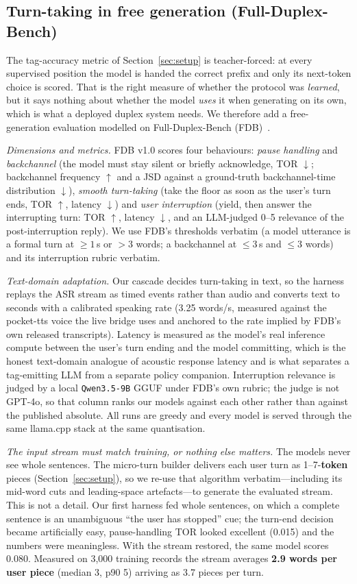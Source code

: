 \documentclass[conference]{IEEEtran}
\begin{document}
\subsection{Turn-taking in free generation (Full-Duplex-Bench)}
\label{sec:fdb_setup}
The tag-accuracy metric of Section~\ref{sec:setup} is teacher-forced: at every
supervised position the model is handed the correct prefix and only its next-token
choice is scored. That is the right measure of whether the protocol was
\emph{learned}, but it says nothing about whether the model \emph{uses} it when
generating on its own, which is what a deployed duplex system needs. We therefore
add a free-generation evaluation modelled on Full-Duplex-Bench
(FDB)~\cite{lin2025fdb}.

\emph{Dimensions and metrics.} FDB v1.0 scores four behaviours: \emph{pause
handling} and \emph{backchannel} (the model must stay silent or briefly
acknowledge, TOR $\downarrow$; backchannel frequency $\uparrow$ and a JSD against
a ground-truth backchannel-time distribution $\downarrow$), \emph{smooth
turn-taking} (take the floor as soon as the user's turn ends, TOR $\uparrow$,
latency $\downarrow$) and \emph{user interruption} (yield, then answer the
interrupting turn: TOR $\uparrow$, latency $\downarrow$, and an LLM-judged 0--5
relevance of the post-interruption reply). We use FDB's thresholds verbatim (a
model utterance is a formal turn at ${\ge}1$\,s or ${>}3$ words; a backchannel at
${\le}3$\,s and ${\le}3$ words) and its interruption rubric verbatim.

\emph{Text-domain adaptation.} Our cascade decides turn-taking in text, so the
harness replays the ASR stream as timed events rather than audio and converts text
to seconds with a calibrated speaking rate (3.25 words/s, measured against the
pocket-tts voice the live bridge uses and anchored to the rate implied by FDB's own
released transcripts). Latency is measured as the model's real inference compute
between the user's turn ending and the model committing, which is the honest
text-domain analogue of acoustic response latency and is what separates a
tag-emitting LLM from a separate policy companion. Interruption relevance is judged
by a local \texttt{Qwen3.5-9B} GGUF under FDB's own rubric; the judge is not
GPT-4o, so that column ranks our models against each other rather than against the
published absolute. All runs are greedy and every model is served through the same
llama.cpp stack at the same quantisation.

\emph{The input stream must match training, or nothing else matters.} The models
never see whole sentences. The micro-turn builder delivers each user turn as
1--7-\textbf{token} pieces (Section~\ref{sec:setup}), so we re-use that algorithm
verbatim---including its mid-word cuts and leading-space artefacts---to generate the
evaluated stream. This is not a detail. Our first harness fed whole sentences, on
which a complete sentence is an unambiguous ``the user has stopped'' cue; the
turn-end decision became artificially easy, pause-handling TOR looked excellent
(0.015) and the numbers were meaningless. With the stream restored, the same model
scores 0.080. Measured on 3{,}000 training records the stream averages
\textbf{2.9 words per user piece} (median 3, p90 5) arriving as 3.7 pieces per turn.
\end{document}
